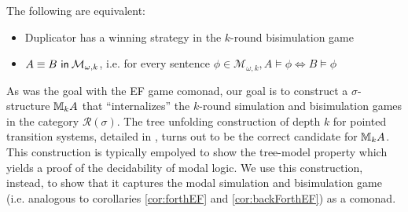 \begin{prop}
The following are equivalent:
\begin{itemize}
\item Duplicator has a winning strategy in the $k$-round bisimulation game 
\item ${A \equiv B \ \mathsf{in}\: \mathcal{M}_{\omega,k}}$, i.e. for every sentence $\phi \in \mathcal{M}_{\omega,k}, A \vDash \phi \Leftrightarrow B \vDash \phi$
\end{itemize}
\end{prop}
As was the goal with the EF game comonad, our goal is to construct a $\sigma$-structure ${\mathbb{M}_{k}A}$ that ``internalizes'' the $k$-round simulation and bisimulation games in the category $\mathcal{R}(\sigma)$. The tree unfolding construction of depth $k$ for pointed transition systems, detailed in \cite{Gradel2014}, turns out to be the correct candidate for ${\mathbb{M}_{k}A}$. This construction is typically empolyed to show the tree-model property which yields a proof of the decidability of modal logic. We use this construction, instead, to show that it captures the modal simulation and bisimulation game (i.e. analogous to corollaries \ref{cor:forthEF} and \ref{cor:backForthEF}) as a comonad.
